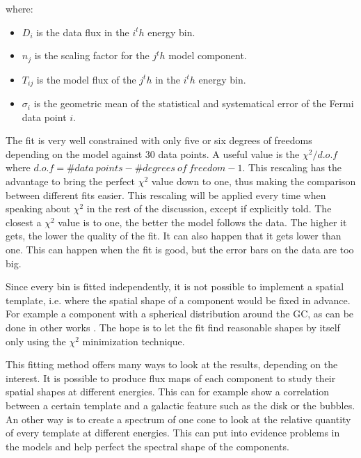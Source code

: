 where:
\begin{itemize}
\item $D_i$ is the data flux in the $i^th$ energy bin.
\item $n_j$ is the scaling factor for the $j^th$ model component.
\item $T_{ij}$ is the model flux of the $j^th$ in the $i^th$ energy bin.
\item $\sigma_i$ is the geometric mean of the statistical and systematical error of the Fermi data point $i$.
\end{itemize}

The fit is very well constrained with only five or six degrees of freedoms depending on the model against 30 data points. A useful value is the $\chi^2 / d.o.f$ where $d.o.f = \#data\ points - \#degrees\ of\ freedom - 1$. This rescaling has the advantage to bring the perfect $\chi^2$ value down to one, thus making the comparison between different fits easier. This rescaling will be applied every time when speaking about $\chi^2$ in the rest of the discussion, except if explicitly told. 
The closest a $\chi^2$ value is to one, the better the model follows the data. The higher it gets, the lower the quality of the fit. It can also happen that it gets lower than one. This can happen when the fit is good, but the error bars on the data are too big.




Since every bin is fitted independently, it is not possible to implement a spatial template, i.e. where the spatial shape of a component would be fixed in advance. For example a component with a spherical distribution around the GC, as can be done in other works . The hope is to let the fit find reasonable shapes by itself only using the $\chi ^2$ minimization technique.




This fitting method offers many ways to look at the results, depending on the interest. It is possible to produce flux maps of each component to study their spatial shapes at different energies. This can for example show a correlation between a certain template and a galactic feature such as the disk or the bubbles. An other way is to create a spectrum of one cone to look at the relative quantity of every template at different energies. This can put into evidence problems in the models and help perfect the spectral shape of the components.

